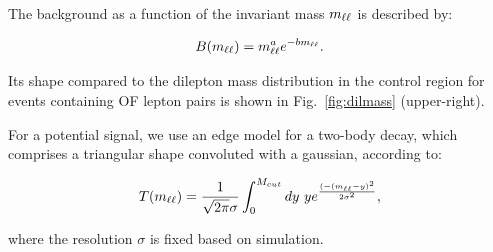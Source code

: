 The background as a function of the invariant mass $m_{\ell\ell}$ is described by:

\begin{equation}
B(m_{\ell\ell}) = m_{\ell\ell}^a e^{-b m_{\ell\ell}}.
\end{equation}

Its shape compared to the dilepton mass distribution in the control region
for events containing OF lepton pairs is shown in Fig.~\ref{fig:dilmass} (upper-right).

For a potential signal, we use an edge model for a two-body decay, 
which comprises a triangular shape convoluted with a gaussian,
according to:

\begin{equation}
T(m_{\ell\ell}) = \frac{1}{\sqrt{2\pi}\sigma}\int_0^{M_{cut}} dy~y e^{\frac{(-(m_{\ell\ell}-y)^2}{2\sigma^2}},
\end{equation}

where the resolution $\sigma$ is fixed based on simulation.

